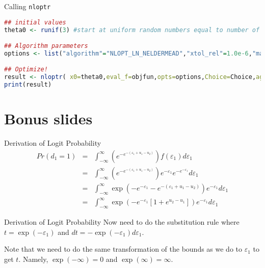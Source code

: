 \documentclass[english,aspectratio=169,12pt,xcolor=dvipsnames]{beamer}
\begin{document}
\begin{frame}[fragile]{Calling \texttt{nloptr}}
\begin{lstlisting}[language=R]
## initial values
theta0 <- runif(3) #start at uniform random numbers equal to number of coefficients

## Algorithm parameters
options <- list("algorithm"="NLOPT_LN_NELDERMEAD","xtol_rel"=1.0e-6,"maxeval"=1e4)

## Optimize!
result <- nloptr( x0=theta0,eval_f=objfun,opts=options,Choice=Choice,age=age)
print(result)
\end{lstlisting}
\end{frame}    



\appendix

\section*{Bonus slides}

\begin{frame}[noframenumbering]{Derivation of Logit Probability}
\begin{eqnarray*}
Pr(d_1=1)&=&\int_{-\infty}^{\infty}\left(e^{-e^{-(\varepsilon_1+u_1-u_2)}}\right)f(\varepsilon_1)d\varepsilon_1\\
&=&\int_{-\infty}^{\infty}\left(e^{-e^{-(\varepsilon_1+u_1-u_2)}}\right)e^{-\varepsilon_1}e^{-e^{-\varepsilon_1}}d\varepsilon_1\\
&=&\int_{-\infty}^{\infty}\exp\left(-e^{-\varepsilon_1}-e^{-(\varepsilon_1+u_1-u_2)}\right)e^{-\varepsilon_1}d\varepsilon_1\\
&=&\int_{-\infty}^{\infty}\exp\left(-e^{-\varepsilon_1}\left[1+e^{u_2-u_1}\right]\right)e^{-\varepsilon_1}d\varepsilon_1
\end{eqnarray*}
\end{frame}

\begin{frame}[noframenumbering]{Derivation of Logit Probability}
Now need to do the substitution rule where $t=\exp(-\varepsilon_1)$ and $dt=-\exp(-\varepsilon_1)d\varepsilon_1$.  

\bigskip

Note that we need to do the same transformation of the bounds as we do to $\varepsilon_1$ to get $t$.  Namely, $\exp(-\infty)=0$ and $\exp(\infty)=\infty$.
\end{frame}
\end{document}
